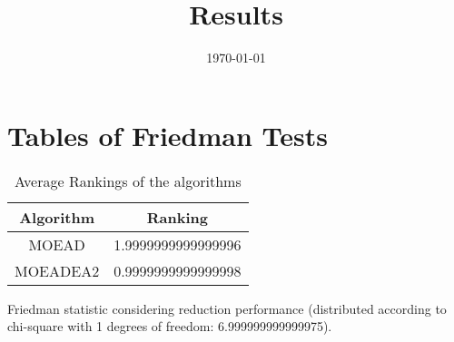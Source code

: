 \documentclass{article}
\title{Results}
\author{}
\date{\today}
\begin{document}
\oddsidemargin 0in \topmargin 0in\maketitle
\section{Tables of Friedman Tests}
\begin{table}[!htp]
\centering
\caption{Average Rankings of the algorithms
}\begin{tabular}{c|c}
Algorithm&Ranking\\
\hline
MOEAD&1.9999999999999996\\
MOEADEA2&0.9999999999999998\\
\end{tabular}
\end{table}


Friedman statistic considering reduction performance (distributed according to chi-square with 1 degrees of freedom: 6.999999999999975).
\end{document}
